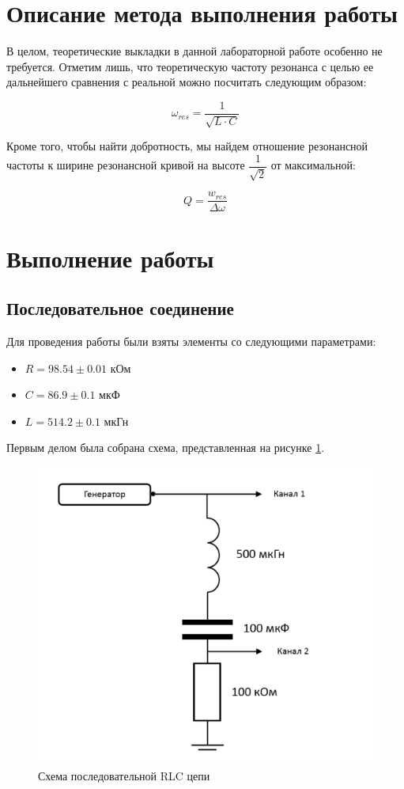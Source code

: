 \documentclass[a4paper, 12pt]{article}
\begin{document}
\section{Описание метода выполнения работы}

В целом, теоретические выкладки в данной лабораторной работе особенно не требуется. Отметим лишь, что теоретическую частоту резонанса с целью ее дальнейшего сравнения с реальной можно посчитать следующим образом:

\begin{equation}
	\omega_{res} = \frac{1}{\sqrt{L \cdot C}}
	\label{eq:omegath}
\end{equation}

Кроме того, чтобы найти добротность, мы найдем отношение резонансной частоты к ширине резонансной кривой на высоте $\dfrac{1}{\sqrt{2}}$ от максимальной:

\begin{equation}
	Q = \frac{w_{res}}{\Delta \omega}
	\label{eq:Q}
\end{equation}

\section{Выполнение работы}

\subsection{Последовательное соединение}

Для проведения работы были взяты элементы со следующими параметрами:

\begin{itemize}
	\item $R = 98.54 \pm 0.01$ кОм
	
	\item $C = 86.9 \pm 0.1$ мкФ
	
	\item $L = 514.2 \pm 0.1$ мкГн
\end{itemize}


Первым делом была собрана схема, представленная на рисунке \ref{fig:series}.

\begin{figure}[h!]
	\centering
	\includegraphics[width=0.4\linewidth]{Series}
	\caption{Схема последовательной RLC цепи}
	\label{fig:series}
\end{figure}
\end{document}
